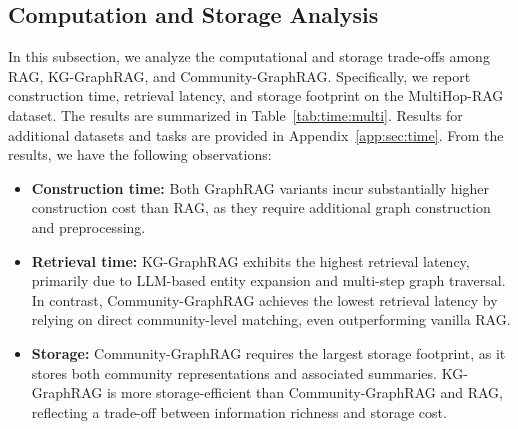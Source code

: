{{\begin{table}[!htb]
\centering
\caption{The time and storage analysis on MultiHop-RAG.}
\label{tab:time:multi}
\vspace{-0.1in}
\vspace{-0.1in}
\end{table}

\subsection{Computation and Storage Analysis}
In this subsection, we analyze the computational and storage trade-offs among RAG, KG-GraphRAG, and Community-GraphRAG. Specifically, we report construction time, retrieval latency, and storage footprint on the MultiHop-RAG dataset. The results are summarized in Table~\ref{tab:time:multi}. Results for additional datasets and tasks are provided in Appendix~\ref{app:sec:time}.
From the results, we have the following observations:
\begin{itemize}[leftmargin=1em]
\item \textbf{Construction time:} Both GraphRAG variants incur substantially higher construction cost than RAG, as they require additional graph construction and preprocessing.
\item \textbf{Retrieval time:} KG-GraphRAG exhibits the highest retrieval latency, primarily due to LLM-based entity expansion and multi-step graph traversal. In contrast, Community-GraphRAG achieves the lowest retrieval latency by relying on direct community-level matching, even outperforming vanilla RAG.
\item \textbf{Storage:} Community-GraphRAG requires the largest storage footprint, as it stores both community representations and associated summaries. KG-GraphRAG is more storage-efficient than Community-GraphRAG and RAG, reflecting a trade-off between information richness and storage cost.
\end{itemize}

}}
